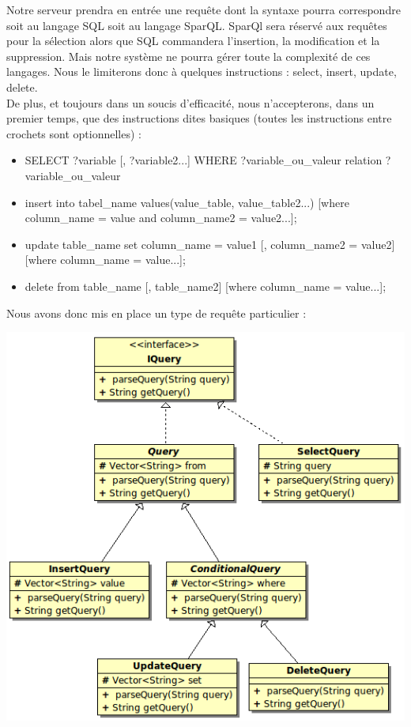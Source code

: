 \documentclass[12pt]{article}
\begin{document}
	Notre serveur prendra en entrée une requête dont la syntaxe pourra correspondre soit au langage SQL soit au langage SparQL. SparQl sera réservé aux requêtes pour la sélection alors que SQL commandera l'insertion, la modification et la suppression. Mais notre système ne pourra gérer toute la complexité de ces langages. Nous le limiterons donc à quelques instructions : select, insert, update, delete.\\
	De plus, et toujours dans un soucis d'efficacité, nous n'accepterons, dans un premier temps, que des instructions dites basiques (toutes les instructions entre crochets sont optionnelles) :\\
	\begin{itemize}
	\item SELECT ?variable [, ?variable2...] WHERE {?variable\_ou\_valeur relation ?variable\_ou\_valeur}\\
	\item insert into tabel\_name values(value\_table, value\_table2...) [where column\_name = value and column\_name2 = value2...];\\
	\item update table\_name set column\_name = value1 [, column\_name2  = value2] [where column\_name = value...];\\
	\item delete from table\_name [, table\_name2] [where column\_name = value...];\\
	\end{itemize}
	\newpage
	Nous avons donc mis en place un type de requête particulier :\\

\begin{center}
	\includegraphics[scale=0.70]{images/QueryHierarchie.png}
\end{center}
\end{document}
